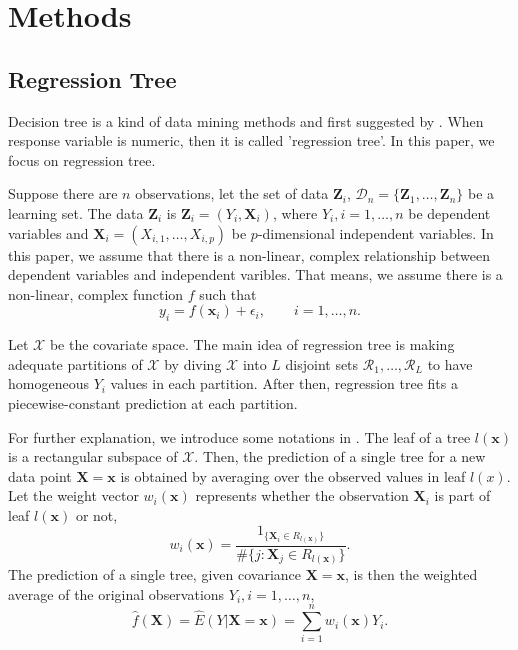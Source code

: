 \documentclass[11pt,titlepage]{article}
\begin{document}
	
	
	\section{Methods}
	
	\subsection{Regression Tree}
	
	Decision tree is a kind of data mining methods and first suggested by \citep{Breiman1984}. When response variable is numeric, then it is called 'regression tree'. In this paper, we focus on regression tree. %
	
	Suppose there are $n$ observations, let the set of data $\mathbf{Z}_{i}$, $\mathcal{D}_{n}=\{ \mathbf{Z}_{1},\dots , \mathbf{Z}_{n} \}$ be a learning set. The data $\mathbf{Z}_{i}$ is $\mathbf{Z}_{i}=(Y_{i},\mathbf{X}_{i})$, where $Y_{i}, i=1,\ldots,n$ be dependent variables and $\mathbf{X}_{i}=(X_{i,1},\ldots, X_{i,p})$ be $p$-dimensional independent variables. In this paper, we assume that there is a non-linear, complex relationship between dependent variables and independent varibles. That means, we assume there is a non-linear, complex function $f$ such that
	$$y_{i}=f(\mathbf{x}_{i})+\epsilon_{i},\qquad{ i=1,\ldots,n.}$$
	
	Let $\mathcal{X}$ be the covariate space. The main idea of regression tree is making adequate partitions of $\mathcal{X}$ by diving $\mathcal{X}$ into $L$ disjoint sets $\mathcal{R}_{1}, \ldots, \mathcal{R}_{L}$ to have homogeneous $Y_{i}$ values in each partition. After then, regression tree fits a piecewise-constant prediction at each partition.
	

	
	For further explanation, we introduce some notations in \citep{Breiman2001}. The leaf of a tree $l(\mathbf{x})$ is a rectangular subspace of $\mathcal{X}$. 
	Then, the prediction of a single tree %
	for a new data point $\mathbf{X}=\mathbf{x}$ is obtained by averaging over the observed values in leaf $l(x)$. Let the weight vector $w_{i}(\mathbf{x})$ %
	represents whether the observation $\mathbf{X}_{i}$ is part of leaf $l(\mathbf{x})$ or not,
	\begin{equation}\label{eq:treeweight}
	w_{i}(\mathbf{x})=\frac{1_{\{ \mathbf{X}_{i} \in R_{l(\mathbf{x})} \}}}{\# \{ j: \mathbf{X}_{j} \in R_{l(\mathbf{x})} \}}.
	\end{equation}
	The prediction of a single tree, given covariance $\mathbf{X}=\mathbf{x}$, is then the weighted average of the original observations $Y_{i},i=1,\ldots,n$,
	\begin{equation}\label{eq:treepred}
	\hat{f}(\mathbf{X})=\hat{E}(Y|\mathbf{X}=\mathbf{x})=\sum_{i=1}^{n}w_{i}(\mathbf{x})Y_{i}.
	\end{equation}
	
\end{document}
